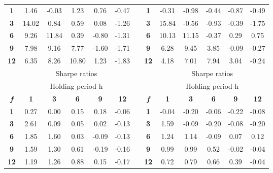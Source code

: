 \documentclass{article}
\begin{document}
\begin{table}[htbp]
\begin{tabular}{ccccccrcccccc}
\cmidrule{2-6}\cmidrule{9-13}    \textbf{1} & 1.46  & -0.03 & 1.23  & 0.76  & -0.47 &       & \textbf{1} & -0.31 & -0.98 & -0.44 & -0.87 & -0.49 \\
    \textbf{3} & 14.02 & 0.84  & 0.59  & 0.08  & -1.26 &       & \textbf{3} & 15.84 & -0.56 & -0.93 & -0.39 & -1.75 \\
    \textbf{6} & 9.26  & 11.84 & 0.39  & -0.80 & -1.31 &       & \textbf{6} & 10.13 & 11.15 & -0.37 & 0.29  & 0.75 \\
    \textbf{9} & 7.98  & 9.16  & 7.77  & -1.60 & -1.71 &       & \textbf{9} & 6.28  & 9.45  & 3.85  & -0.09 & -0.27 \\
    \textbf{12} & 6.35  & 8.26  & 10.80 & 1.23  & -1.83 &       & \textbf{12} & 4.18  & 7.01  & 7.94  & 3.04  & -0.24 \\
    \midrule
          & \multicolumn{5}{c}{Sharpe ratios}     &       &       & \multicolumn{5}{c}{Sharpe ratios} \\
    \midrule
          & \multicolumn{5}{c}{Holding period h}  &       &       & \multicolumn{5}{c}{Holding period h} \\
    \textit{\textbf{f}} & \textbf{1} & \textbf{3} & \textbf{6} & \textbf{9} & \textbf{12} &       & \textit{\textbf{f}} & \textbf{1} & \textbf{3} & \textbf{6} & \textbf{9} & \textbf{12} \\
\cmidrule{2-6}\cmidrule{9-13}    \textbf{1} & 0.27  & 0.00  & 0.15  & 0.18  & -0.06 &       & \textbf{1} & -0.04 & -0.20 & -0.06 & -0.22 & -0.08 \\
    \textbf{3} & 2.61  & 0.09  & 0.05  & 0.02  & -0.13 &       & \textbf{3} & 1.59  & -0.09 & -0.20 & -0.08 & -0.20 \\
    \textbf{6} & 1.85  & 1.60  & 0.03  & -0.09 & -0.13 &       & \textbf{6} & 1.24  & 1.14  & -0.09 & 0.07  & 0.12 \\
    \textbf{9} & 1.59  & 1.30  & 0.61  & -0.19 & -0.16 &       & \textbf{9} & 0.99  & 0.99  & 0.52  & -0.02 & -0.04 \\
    \textbf{12} & 1.19  & 1.26  & 0.88  & 0.15  & -0.17 &       & \textbf{12} & 0.72  & 0.79  & 0.66  & 0.39  & -0.04 \\
    \bottomrule
    \end{tabular}%
  \label{tab:addlabel}%
\end{table}%
\end{document}
